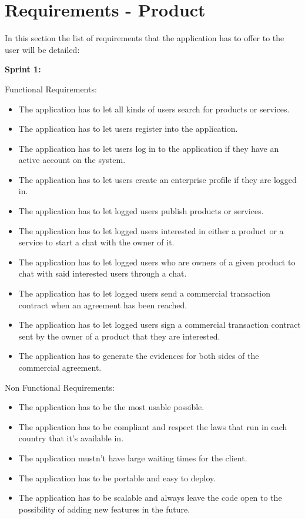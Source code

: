 \documentclass[./main.tex]{subfiles}
\begin{document}
\section{Requirements - Product}

In this section the list of requirements that the application has to
offer to the user will be detailed:

\textbf{Sprint 1:}

Functional Requirements:

\begin{itemize}

\item
  The application has to let all kinds of users search for products or
  services.
\item
  The application has to let users register into the application.
\item
  The application has to let users log in to the application if they
  have an active account on the system.
\item
  The application has to let users create an enterprise profile if they
  are logged in.
\item
  The application has to let logged users publish products or services.
\item
  The application has to let logged users interested in either a product
  or a service to start a chat with the owner of it.
\item
  The application has to let logged users who are owners of a given
  product to chat with said interested users through a chat.
\item
  The application has to let logged users send a commercial transaction
  contract when an agreement has been reached.
\item
  The application has to let logged users sign a commercial transaction
  contract sent by the owner of a product that they are interested.
\item
  The application has to generate the evidences for both sides of the
  commercial agreement.
\end{itemize}

Non Functional Requirements:

\begin{itemize}

\item
  The application has to be the most usable possible.
\item
  The application has to be compliant and respect the laws that run in
  each country that it's available in.
\item
  The application mustn't have large waiting times for the client.
\item
  The application has to be portable and easy to deploy.
\item
  The application has to be scalable and always leave the code open to
  the possibility of adding new features in the future.
\end{itemize}
\end{document}
